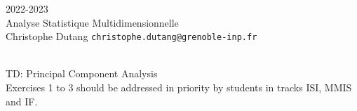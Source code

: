 \begin{flushleft}
 \hfill {} 2022-2023 \\
Analyse Statistique Multidimensionnelle \\
Christophe Dutang   \hfill  \texttt{christophe.dutang@grenoble-inp.fr} \\


\HRuleTop\\
\begin{center}
\Large{TD: Principal Component Analysis}\\
\normalsize{Exercises 1 to 3 should be addressed in priority by students in tracks ISI, MMIS 
	and IF.}
\end{center}
\HRuleBottom
\end{flushleft}
